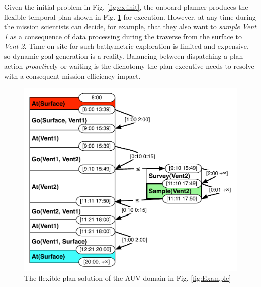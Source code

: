 Given the initial problem in Fig. \ref{fig:ex:init}, the onboard planner 
produces the flexible temporal plan shown in
Fig. \ref{fig:ex:plan} for execution. However, at any time during the mission
scientists can decide, for example, that they also want to {\em
  sample} {\em Vent 1} as a consequence of data processing during the
traverse from the surface to {\em Vent 2}.  Time on site for such
bathymetric exploration is limited and expensive, so dynamic goal
generation is a reality.  Balancing between dispatching a plan action
\emph{proactive}ly or waiting is the
dichotomy the plan executive needs to resolve with a consequent mission
efficiency impact.


\begin{figure}[!htb]
  \centering
  \includegraphics[width=0.8\columnwidth]{figs/example_plan}
  \vskip-2mm
  \caption{\small The flexible plan solution of the AUV domain in
    Fig. \ref{fig:Example}}
  \label{fig:ex:plan}
\end{figure}

